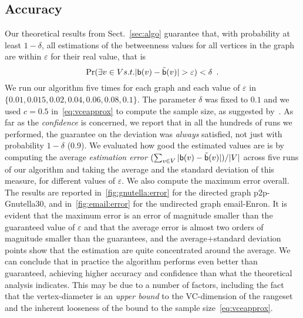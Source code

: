 \begin{table*}[ht]
\begin{small}
\end{small}
\caption{\XXX
}
\label{tab:expDir} %
\end{table*}
\subsection{Accuracy}\label{sec:accuracy}
Our theoretical results from Sect.~\ref{sec:algo} guarantee that, with probability
at least $1-\delta$, all estimations of the betweenness values for all vertices
in the graph are within $\varepsilon$ for their real value, that is
\[
\Pr(\exists v\in V \mbox{ s.t. }
|\betw(v)-\tilde\betw(v)|>\varepsilon)<\delta\enspace.
\]
We run our algorithm five times for each graph and each value of $\varepsilon$
in $\{0.01, 0.015, 0.02, 0.04, 0.06, 0.08, 0.1\}$. The parameter $\delta$ was
fixed to $0.1$ and we used $c=0.5$ in~\eqref{eq:vceapprox} to compute the sample
size, as suggested by~\citet{LofflerP09}. As far as the \emph{confidence} is
concerned, we report that in all the hundreds of runs we performed, the
guarantee on the deviation was \emph{always} satisfied, not just with
probability $1-\delta$ (0.9). We evaluated how good the estimated values are is
by computing the average \emph{estimation error} $(\sum_{v\in
V}|\mathsf{b}(v)-\tilde{\mathsf{b}}(v)|)/|V|$ across five runs of our algorithm and taking
the average and the standard deviation of this measure, for different values of
$\varepsilon$. We also compute the maximum error overall. The results are
reported in~\cref{fig:gnutella:error} for the directed graph p2p-Gnutella30, and
in~\cref{fig:email:error} for the undirected graph email-Enron. It is evident
that the maximum error is an error of magnitude smaller than the guaranteed
value of $\varepsilon$ and that the average error is almost two orders of
magnitude smaller than the guarantees, and the average+standard deviation points
show that the estimation are quite concentrated around the average. We can
conclude that in practice the algorithm performs even better than guaranteed,
achieving higher accuracy and confidence than what the theoretical analysis
indicates. This may be due to a number of factors, including the fact that the
vertex-diameter is an \emph{upper bound} to the VC-dimension of the rangeset and
the inherent looseness of the bound to the sample size~\eqref{eq:vceapprox}.

